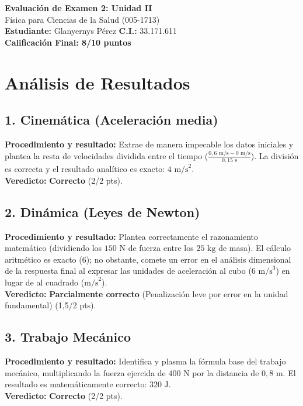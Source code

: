 \documentclass[12pt,letterpaper]{article}
\begin{document}
\begin{center}
    \Large \textbf{Evaluación de Examen 2: Unidad II} \\
    \large Física para Ciencias de la Salud (005-1713) \\
    \vspace{0.5cm}
    \textbf{Estudiante:} Glanyernys Pérez \quad \textbf{C.I.:} 33.171.611
    \vspace{0.3cm} \\
    \large \textbf{Calificación Final: 8/10 puntos}
\end{center}

\vspace{0.5cm}

\section*{Análisis de Resultados}

\subsection*{1. Cinemática (Aceleración media)}
\textbf{Procedimiento y resultado:} Extrae de manera impecable los datos iniciales y plantea la resta de velocidades dividida entre el tiempo ($\frac{0,6 \text{ m/s} - 0 \text{ m/s}}{0,15 \text{ s}}$). La división es correcta y el resultado analítico es exacto: $4 \text{ m/s}^2$. \\
\textbf{Veredicto:} \textbf{Correcto} (2/2 pts).

\subsection*{2. Dinámica (Leyes de Newton)}
\textbf{Procedimiento y resultado:} Plantea correctamente el razonamiento matemático (dividiendo los $150 \text{ N}$ de fuerza entre los $25 \text{ kg}$ de masa). El cálculo aritmético es exacto ($6$); no obstante, comete un error en el análisis dimensional de la respuesta final al expresar las unidades de aceleración al cubo ($6 \text{ m/s}^3$) en lugar de al cuadrado ($\text{m/s}^2$). \\
\textbf{Veredicto:} \textbf{Parcialmente correcto} (Penalización leve por error en la unidad fundamental) (1,5/2 pts).

\subsection*{3. Trabajo Mecánico}
\textbf{Procedimiento y resultado:} Identifica y plasma la fórmula base del trabajo mecánico, multiplicando la fuerza ejercida de $400 \text{ N}$ por la distancia de $0,8 \text{ m}$. El resultado es matemáticamente correcto: $320 \text{ J}$. \\
\textbf{Veredicto:} \textbf{Correcto} (2/2 pts).
\end{document}
